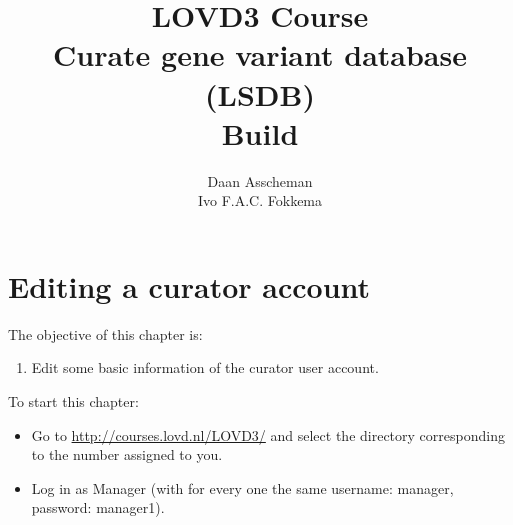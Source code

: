


\title{LOVD3 Course \\\vskip 0.2cm Curate gene variant database (LSDB) \\\vskip 0.2cm Build \LOVDversion}
\author{Daan Asscheman \\ Ivo F.A.C. Fokkema}
\setpointerwidth{9pt}








\begin{titlingpage} %
\maketitle
\end{titlingpage}





\hypertarget{toc}{}
\tableofcontents










\chapter{Editing a curator account}
The objective of this chapter is:
\begin{enumerate}
	\item 
	Edit some basic information of the curator user account.
\end{enumerate}
To start this chapter:
\begin{itemize}
	\item 
	Go to \url{http://courses.lovd.nl/LOVD3/} and select the directory corresponding to the number assigned to
	 you.
	\item
	Log in as Manager (with for every one the same username: manager, password: \newline manager1).
\end{itemize}

